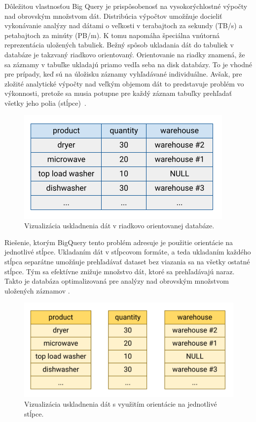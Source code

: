 Dôležitou vlastnosťou Big Query je prispôsobenosť na vysokorýchlostné výpočty nad obrovským množstvom dát.
Distribúcia výpočtov umožňuje docieliť vykonávanie analýzy nad dátami o veľkosti v terabajtoch za sekundy (TB/s) a petabajtoch za minúty (PB/m).
K tomu napomáha špeciálna vnútorná reprezentácia uložených tabuliek. 
Bežný spôsob ukladania dát do tabuliek v databáze je takzvaný riadkovo orientovaný.
Orientovanie na riadky znamená, že sa záznamy v tabuľke ukladajú priamo vedľa seba na disk databázy.
To je vhodné pre prípady, keď sú na úložisku záznamy vyhľadávané individuálne.
Avšak, pre zložité analytické výpočty nad veľkým objemom dát to predstavuje problém vo výkonnosti, pretože sa musia potupne pre každý záznam tabuľky prehľadať všetky jeho polia \mbox{(stĺpce) \cite{google-bq}}.

\begin{figure}[htb]
\begin{center}
 \includegraphics[scale=0.7]{obrazky-figures/row-oriented-store.png}
 \caption{Vizualizácia uskladnenia dát v riadkovo orientovanej databáze.}
 \label{img:row-oriented-store}
\end{center}
\end{figure}

Riešenie, ktorým BigQuery tento problém adresuje je použitie orientácie na jednotlivé stĺpce. 
Ukladaním dát v stĺpcovom formáte, a teda ukladaním každého stĺpca separátne umožňuje prehľadávať dataset bez viazania sa na všetky ostatné stĺpce.
Tým sa efektívne znižuje množstvo dát, ktoré sa prehľadávajú naraz.
Takto je databáza optimalizovaná pre analýzy nad obrovským množstvom uložených záznamov \cite{google-bq}.

\begin{figure}[htb]
\begin{center}
 \includegraphics[scale=0.7]{obrazky-figures/column-oriented-store.png}
 \caption{Vizualizácia uskladnenia dát s využitím orientácie na jednotlivé stĺpce.}
 \label{img:column-oriented-store}
\end{center}
\end{figure}

